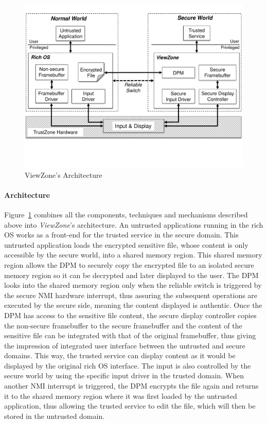 
\begin{figure}[t!]
	\centering
	\includegraphics[width=1\textwidth]{img/viewzone_architecture.pdf}
	\caption{ViewZone's Architecture}
	\label{fig:viewzone_architecture}
\end{figure}

\paragraph{\textbf{Architecture}} Figure~\ref{fig:viewzone_architecture} combines all the components, techniques and mechanisms described above into \emph{ViewZone}'s architecture. An untrusted applications running in the rich OS works as a front-end for the trusted service in the secure domain. This untrusted application loads the encrypted sensitive file, whose content is only accessible by the secure world, into a shared memory region. This shared memory region allows the \ac{DPM} to securely copy the encrypted file to an isolated secure memory region so it can be decrypted and later displayed to the user. The \ac{DPM} looks into the shared memory region only when the reliable switch is triggered by the secure \ac{NMI} hardware interrupt, thus assuring the subsequent operations are executed by the secure side, meaning the content displayed is authentic. Once the \ac{DPM} has access to the sensitive file content, the secure display controller copies the non-secure framebuffer to the secure framebuffer and the content of the sensitive file can be integrated with that of the original framebuffer, thus giving the impression of integrated user interface between the untrusted and secure domains. This way, the trusted service can display content as it would be displayed by the original rich OS interface. The input is also controlled by the secure world by using the specific input driver in the trusted domain. When another \ac{NMI} interrupt is triggered, the \ac{DPM} encrypts the file again and returns it to the shared memory region where it was first loaded by the untrusted application, thus allowing the trusted service to edit the file, which will then be stored in the untrusted domain.